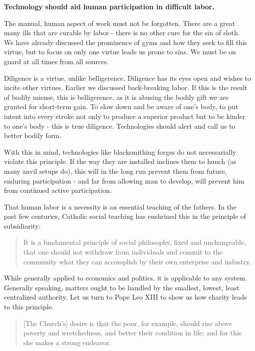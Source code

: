 \documentclass[letterpaper]{article}
\begin{document}
\textbf{Technology should aid human participation in difficult labor.}

The manual, human aspect of work must not be forgotten. There are a great many ills that are curable by labor - there is no other cure for the sin of sloth. We have already discussed the prominence of gyms and how they seek to fill this virtue, but to focus on only one virtue leads us prone to sins. We must be on guard at all times from all sources.

Diligence is a virtue, unlike belligerence. Diligence has its eyes open and wishes to incite other virtues. Earlier we discussed back-breaking labor. If this is the result of bodily misuse, this is belligerence, as it is abusing the bodily gift we are granted for short-term gain. To slow down and be aware of one's body, to put intent into every stroke not only to produce a superior product but to be kinder to one's body - this is true diligence. Technologies should alert and call us to better bodily form.

With this in mind, technologies like blacksmithing forges do not necessarially violate this principle. If the way they are installed inclines them to hunch (as many anvil setups do), this will in the long run prevent them from future, enduring participation - and far from allowing man to develop, will prevent him from continued active participation.

That human labor is a necessity is an essential teaching of the fathers. 
In the past few centuries, Catholic social teaching has enshrined this in the principle of subsidiarity:

\begin{quote}
  It is a fundamental principle of social philosophy, fixed and unchangeable, that one should not withdraw from individuals and commit to the community what they can accomplish by their own enterprise and industry.
\end{quote}

While generally applied to economics and politics, it is applicable to any system. Generally speaking, matters ought to be handled by the smallest, lowest, least centralized authority. Let us turn to Pope Leo XIII to show us how charity leads to this principle.

\begin{quote}
  [The Church's] desire is that the poor, for example, should rise above poverty and wretchedness, and better their condition in life; and for this she makes a strong endeavor.
\end{quote}
\end{document}
